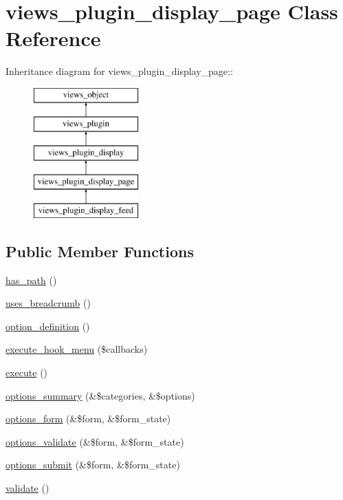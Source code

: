 \hypertarget{classviews__plugin__display__page}{
\section{views\_\-plugin\_\-display\_\-page Class Reference}
\label{classviews__plugin__display__page}
}
Inheritance diagram for views\_\-plugin\_\-display\_\-page::\begin{figure}[H]
\begin{center}
\leavevmode
\includegraphics[height=5cm]{classviews__plugin__display__page}
\end{center}
\end{figure}
\subsection*{Public Member Functions}
\begin{CompactItemize}
\item 
\hyperlink{classviews__plugin__display__page_6ab3df375279fc7308aea96e3f08f833}{has\_\-path} ()
\item 
\hyperlink{classviews__plugin__display__page_cbdafb32168f809b28e083d654399f3f}{uses\_\-breadcrumb} ()
\item 
\hyperlink{classviews__plugin__display__page_19b25a55cb43755a944d1f37c0180ff4}{option\_\-definition} ()
\item 
\hyperlink{classviews__plugin__display__page_92137bfe76641bd6c50e7d8b81108b91}{execute\_\-hook\_\-menu} (\$callbacks)
\item 
\hyperlink{classviews__plugin__display__page_943b71fc873e5d09f548b69ba314b674}{execute} ()
\item 
\hyperlink{classviews__plugin__display__page_47de087f3201600b057e0d4a55eef48c}{options\_\-summary} (\&\$categories, \&\$options)
\item 
\hyperlink{classviews__plugin__display__page_a8267a4774b92a7b47a3768ac98aac36}{options\_\-form} (\&\$form, \&\$form\_\-state)
\item 
\hyperlink{classviews__plugin__display__page_192c8feb8740fdb389600fb7a8588c27}{options\_\-validate} (\&\$form, \&\$form\_\-state)
\item 
\hyperlink{classviews__plugin__display__page_9b03d35a15fcfcae4a474ea56b6ca5b6}{options\_\-submit} (\&\$form, \&\$form\_\-state)
\item 
\hyperlink{classviews__plugin__display__page_995cf48d67e20ef897d931fcbba391d1}{validate} ()
\end{CompactItemize}


